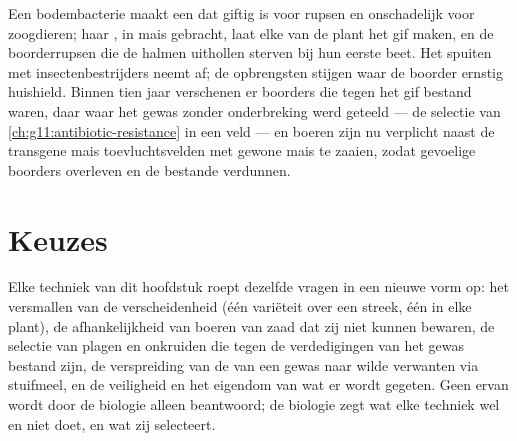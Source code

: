 \begin{example}\label{ex:g12:domesticated-plants:bt}
Een bodembacterie maakt een  dat giftig is voor rupsen en
onschadelijk voor zoogdieren; haar , in mais gebracht, laat elke 
van de plant het gif maken, en de boorderrupsen die de halmen uithollen
sterven bij hun eerste beet. Het spuiten met insectenbestrijders neemt af;
de opbrengsten stijgen waar de boorder ernstig huishield. Binnen tien jaar
verschenen er boorders die tegen het gif bestand waren, daar waar het
gewas zonder onderbreking werd geteeld --- de selectie van
\cref{ch:g11:antibiotic-resistance} in een veld --- en boeren zijn nu
verplicht naast de transgene mais toevluchtsvelden met gewone mais te
zaaien, zodat gevoelige boorders overleven en de bestande verdunnen.
\end{example}

\section{Keuzes}

\begin{proposition}\label{prop:g12:domesticated-plants:stakes}
Elke techniek van dit hoofdstuk roept dezelfde vragen in een nieuwe vorm
op: het versmallen van de verscheidenheid (één variëteit over een streek,
één  in elke plant), de afhankelijkheid van boeren van zaad dat zij niet
kunnen bewaren, de selectie van plagen en onkruiden die tegen de
verdedigingen van het gewas bestand zijn, de verspreiding van de  van
een gewas naar wilde verwanten via stuifmeel, en de veiligheid en het
eigendom van wat er wordt gegeten. Geen ervan wordt door de biologie alleen
beantwoord; de biologie zegt wat elke techniek wel en niet doet, en wat
zij selecteert.
\end{proposition}
\admitted

